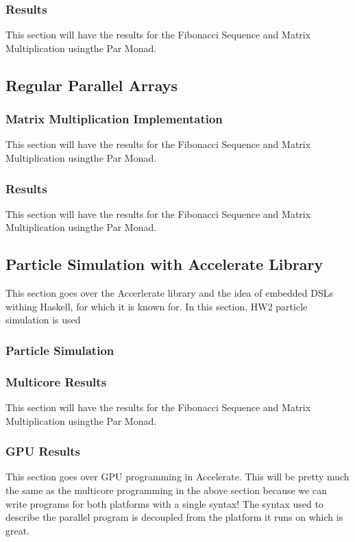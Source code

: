 \documentclass[a4paper, 10pt]{article}
\begin{document}
\subsubsection{Results}
This section will have the results for the Fibonacci Sequence and Matrix Multiplication usingthe Par Monad.

\subsection{Regular Parallel Arrays}

\subsubsection{Matrix Multiplication Implementation}
This section will have the results for the Fibonacci Sequence and Matrix Multiplication usingthe Par Monad.

\subsubsection{Results}
This section will have the results for the Fibonacci Sequence and Matrix Multiplication usingthe Par Monad.

\subsection{Particle Simulation with Accelerate Library}
This section goes over the Accerlerate library and the idea of embedded DSLs withing Haskell, for which it
 is known for. In this section, HW2 particle simulation is used

\subsubsection{Particle Simulation}

\subsubsection{Multicore Results}
This section will have the results for the Fibonacci Sequence and Matrix Multiplication usingthe Par Monad.

\subsubsection{GPU Results}
This section goes over GPU programming in Accelerate. This will be pretty much the same
as the multicore programming in the above section because we can write programs for both platforms
with a single syntax! The syntax used to describe the parallel program is decoupled from the platform it runs on which is great.
\end{document}
